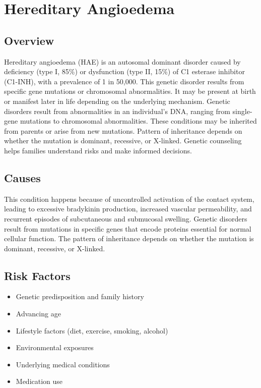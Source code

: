 \chapter{Hereditary Angioedema}
\label{sec:Hereditary Angioedema}

\section{Overview}
Hereditary angioedema (HAE) is an autosomal dominant disorder caused by deficiency (type I, 85\%) or dysfunction (type II, 15\%) of C1 esterase inhibitor (C1-INH), with a prevalence of 1 in 50,000. This genetic disorder results from specific gene mutations or chromosomal abnormalities. It may be present at birth or manifest later in life depending on the underlying mechanism. Genetic disorders result from abnormalities in an individual's DNA, ranging from single-gene mutations to chromosomal abnormalities. These conditions may be inherited from parents or arise from new mutations. Pattern of inheritance depends on whether the mutation is dominant, recessive, or X-linked. Genetic counseling helps families understand risks and make informed decisions.
\section{Causes}
This condition happens because of uncontrolled activation of the contact system, leading to excessive bradykinin production, increased vascular permeability, and recurrent episodes of subcutaneous and submucosal swelling. Genetic disorders result from mutations in specific genes that encode proteins essential for normal cellular function. The pattern of inheritance depends on whether the mutation is dominant, recessive, or X-linked.   
\section{Risk Factors}

\begin{itemize}[noitemsep]
  \item Genetic predisposition and family history
  \item Advancing age
  \item Lifestyle factors (diet, exercise, smoking, alcohol)
  \item Environmental exposures
  \item Underlying medical conditions
  \item Medication use
\end{itemize}
